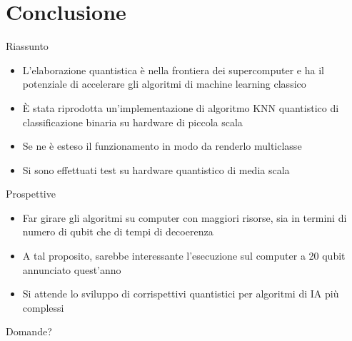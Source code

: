 \documentclass{beamer}
\begin{document}
    \section{Conclusione}

    \begin{frame}{Riassunto}
        \begin{itemize}
            \item L'elaborazione quantistica è nella frontiera dei supercomputer e ha il potenziale di accelerare gli algoritmi di machine learning classico
            \item È stata riprodotta un'implementazione di algoritmo KNN quantistico di classificazione binaria su hardware di piccola scala
            \item Se ne è esteso il funzionamento in modo da renderlo multiclasse
            \item Si sono effettuati test su hardware quantistico di media scala
        \end{itemize}
    \end{frame}

    \begin{frame}{Prospettive}
        \begin{itemize}
            \item Far girare gli algoritmi su computer con maggiori risorse, sia in termini di numero di qubit che di tempi di decoerenza
            \item A tal proposito, sarebbe interessante l'esecuzione sul computer a 20 qubit annunciato quest'anno
            \item Si attende lo sviluppo di corrispettivi quantistici per algoritmi di IA più complessi
        \end{itemize}
    \end{frame}

    \begin{frame}[focus]
        Domande?
    \end{frame}
\end{document}
